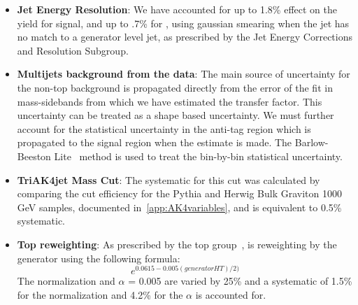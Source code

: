 \begin{itemize}
\item \textbf{Jet Energy Resolution}: We have accounted for up to 1.8\% effect on the yield for signal, and up to .7\% for \ttbar, using gaussian smearing when the jet has no match to a generator level jet, as prescribed by the Jet Energy Corrections and Resolution Subgroup.


\item \textbf{Multijets background from the data}: %
The main source of uncertainty for the non-top background is propagated directly from the error of the fit in mass-sidebands from which we have estimated the transfer factor. This uncertainty can be treated as a shape based uncertainty. 
We must further account for the statistical uncertainty in the anti-tag region which is propagated to the signal region when the estimate is made. 
The Barlow-Beeston Lite~\cite{BBLite} method is used to treat the bin-by-bin statistical uncertainty. 

\item \textbf{TriAK4jet Mass Cut}: The systematic for this cut was calculated by comparing the cut efficiency for the Pythia and Herwig Bulk Graviton 1000 GeV samples, documented in~\ref{app:AK4variables}, and is equivalent to 0.5\% systematic. 

\item \textbf{Top \pt reweighting}: As prescribed by the top group~\cite{CMS-PAS-TOP-16-011,CMS-PAS-TOP-16-008}, \ttbar is reweighting by the generator \pt using the following formula:
\begin{equation}
e^{0.0615 - 0.005(generator HT)/2)}
\label{eq:ptreweight}
\end{equation}
The normalization and $\alpha$ = 0.005 are varied by 25\% and a systematic of 1.5\% for the normalization and 4.2\% for the $\alpha$ is accounted for.
\end{itemize}

